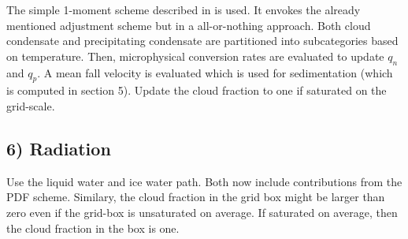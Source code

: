 \documentclass[dvipdfmx,a4paper,10pt]{article}
\begin{document}
The simple 1-moment scheme described in \cite{khairou03} is used. It envokes the already mentioned adjustment scheme but in a all-or-nothing approach. Both cloud condensate and precipitating condensate are partitioned into subcategories based on temperature. Then, microphysical conversion rates are evaluated to update $q_n$ and $q_p$. A mean fall velocity is evaluated which is used for sedimentation (which is computed in section 5). Update the cloud fraction to one if saturated on the grid-scale.

\subsection{6) Radiation}

Use the liquid water and ice water path. Both now include contributions from the PDF scheme. Similary, the cloud fraction in the grid box might be larger than zero even if the grid-box is unsaturated on average. If saturated on average, then the cloud fraction in the box is one. 







%

 
\end{document}
